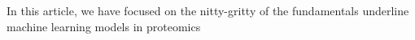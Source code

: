 In this article, we have focused on the nitty-gritty of the fundamentals underline machine learning models  in proteomics
